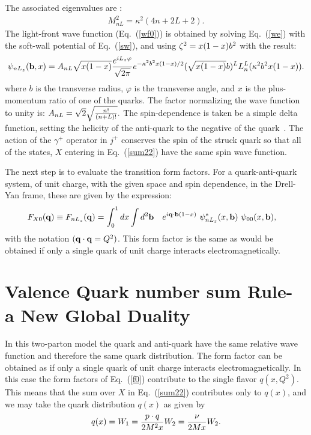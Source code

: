 \documentclass[aps,prd,amsmath,longbibliography]{revtex4-1}
\newcommand{\eq}[1]{Eq.~(\ref{#1})}
\def\bea{\begin{eqnarray}}
\def\eea{\end{eqnarray}}\def\a{\alpha}\newcommand{\bfk}{{\bf k}}\newcommand{\bfq}{{\bf q}}
\def\g{\gamma}\def\m{\mu}\def\t{\tau}\def\ve{\varepsilon}\def\l{\lambda}\def\s{\sigma}\def\n{\nu}\def\o{\omega}
\begin{document}
{	
		The associated eigenvalues are :
	\bea M^2_{nL} = \kappa^2(4n+2L+2) . \label{mass1}\eea
The  light-front wave function (\eq{wf0}) is obtained  by  	solving \eq{we} with the soft-wall potential of \eq{sw}, and using 
$\zeta^2=x(1-x)b^2$ with the result:
	\bea \psi_{nL_z}(\bfb,x) = A_{nL} \sqrt{x(1-x)}{e^{i L_z \varphi} \over\sqrt{2\pi}}e^{-\k^2b^2 x(1-x)/2}(\sqrt{x(1-x)}b)^{L} L_n^{L}(\k^2 b^2 x(1-x)).\label{wf}\eea
		where  $ b $ is the transverse radius, $ \varphi $ is the transverse angle, and $ x $ is the plus-momentum ratio of one of the quarks.  
The factor normalizing the wave function to unity is:
%
$ A_{nL}= {\sqrt{2} }\sqrt{n!\over (n+L)!}.$
The spin-dependence is taken be a simple delta function, setting the helicity of the anti-quark to the negative of the quark~\cite{Lepage:1980fj,Brodsky:2007hb}. The action of the $\g^+$ operator in $j^+$ conserves the spin of the struck quark so that all of the states, $X$ entering in \eq{sum22} have the same spin wave function.


The next step is to evaluate the  transition form factors.
 For a quark-anti-quark system, of unit charge, with the given space and spin dependence,  in the Drell-Yan frame,
these are given by the expression:
		\bea &F_{X0}(\bfq) \equiv F_{nL_z} (\bfq) =\int_{0}^{1} dx \int d^2\bfb  \ \ \ e^{i {\bfq} \cdot {\bfb} (1-x)} \ \psi^*_{nL_z}(x,{\bfb}) \ \psi_{00}(x,\bfb),\label{tf} \eea
with the notation $ (\bfq\cdot \bfq=Q^2)$. This form factor is the same as would be obtained if only a single quark of unit charge interacts electromagnetically.
		
\section{Valence Quark number sum Rule- a New Global Duality}\label{sec:sum}
In this two-parton model the quark and anti-quark have the same relative wave function and therefore the same quark distribution.
The form factor can be obtained as if only a single quark of unit charge interacts electromagnetically. In this case the form factors of \eq{f0} contribute to the single flavor $q(x,Q^2)$.
This means that the sum over $X$ in \eq{sum22} contributes only to $q(x)$, and 
we may take
   the quark distribution $q(x)$ as given by
\bea q(x)=W_1={p\cdot q\over 2M^2 x}W_2={\nu\over 2Mx}W_2.\label{qW}\eea\\

}
\end{document}
